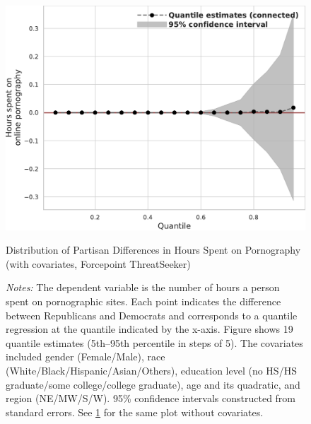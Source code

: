 \documentclass[12pt,twoside]{article}
\begin{document}
\begin{figure}[ht]
	\centering
	\includegraphics[width=.6\linewidth]{figs/forcepoint_quantile_reg_covariates_duration_adult.pdf}
	\caption{Distribution of Partisan Differences in Hours Spent on Pornography (with covariates, Forcepoint ThreatSeeker)}
	\caption*{\footnotesize \emph{Notes:} 
		The dependent variable is the number of hours a person spent on pornographic sites.
		Each point indicates the difference between Republicans and Democrats and corresponds to a quantile regression at the quantile indicated by the x-axis.
  Figure shows 19 quantile estimates (5th--95th percentile in steps of 5).
		The covariates included gender (Female/Male), race (White/Black/Hispanic/Asian/Others), education level (no HS/HS graduate/some college/college graduate), age and its quadratic, and region (NE/MW/S/W).
		95\% confidence intervals constructed from standard errors.
		See \cref{fig:forcepoint_quantile_regression_duration_covariates} for the same plot without covariates.
	}
	\label{fig:forcepoint_quantile_regression_duration_covariates}
\end{figure}





\FloatBarrier
\clearpage
\end{document}
